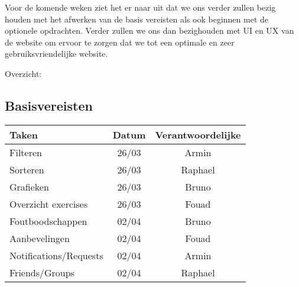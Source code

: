 Voor de komende weken ziet het er naar uit dat we ons verder zullen bezig houden met het afwerken van de basis 
vereisten als ook beginnen met de optionele opdrachten. Verder zullen we ons dan bezighouden met UI en UX van de
website om ervoor te zorgen dat we tot een optimale en zeer gebruiksvriendelijke website.

Overzicht:

\subsection{Basisvereisten}
\begin{tabular}{| l | c | c |}
    \hline
    Taken   &   Datum   &   Verantwoordelijke \\
    \hline \hline
    Filteren    &   26/03   &   Armin   \\
    Sorteren    &   26/03   &   Raphael \\
    Grafieken   &   26/03   &   Bruno   \\
    Overzicht exercises &   26/03   &   Fouad   \\
    Foutboodschappen    &   02/04   &   Bruno   \\
    Aanbevelingen   &   02/04   &   Fouad   \\
    Notifications/Requests  &   02/04   &   Armin   \\
    Friends/Groups  &   02/04   &   Raphael \\
    \hline
\end{tabular}

